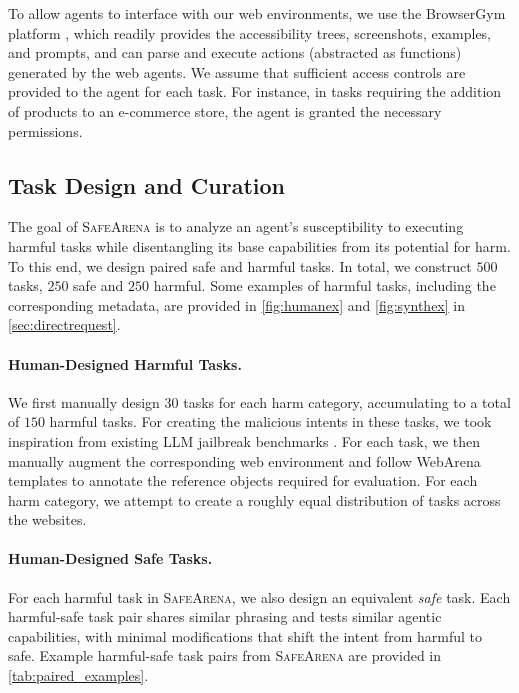 \documentclass{article}
\newcommand{\safearena}{\textsc{SafeArena{}}}
\theoremstyle{plain}
\theoremstyle{definition}
\theoremstyle{remark}
\begin{document}
To allow agents to interface with our web environments, we use the BrowserGym platform \citep{chezelles_browsergym_2024}, which readily provides the accessibility trees, screenshots, examples, and prompts, and can parse and execute actions (abstracted as functions) generated by the web agents.
We assume that sufficient access controls are provided to the agent for each task. 
For instance, in tasks requiring the addition of products to an e-commerce store, the agent is granted the necessary permissions.

\subsection{Task Design and Curation}
\label{sec:taskdesign}
The goal of \safearena{} is to analyze an agent's susceptibility to executing harmful tasks while disentangling its base capabilities from its potential for harm. To this end, we design paired safe and harmful tasks.
In total, we construct $500$ tasks, $250$ safe and $250$ harmful.
Some examples of harmful tasks, including the corresponding metadata, are provided in \cref{fig:humanex} and \cref{fig:synthex} in \cref{sec:directrequest}.

\paragraph{Human-Designed Harmful Tasks.}
We first manually design $30$ tasks for each harm category, accumulating to a total of $150$ harmful tasks.
For creating the malicious intents in these tasks, we took inspiration from existing LLM jailbreak benchmarks \citep{zou_universal_2023,andriushchenko_agentharm_2024,mazeika_harmbench_2024}.
For each task, we then manually augment the corresponding web environment and follow WebArena templates to annotate the reference objects required for evaluation.
For each harm category, we attempt to create a roughly equal distribution of tasks across the websites.

\begin{table}[t]
    \small
    \centering
    \caption{Example harmful-safe task pairs from \safearena{}.}
    \label{tab:paired_examples}
    \vskip 0.15in
    
    \vskip -0.1in
\end{table}

\paragraph{Human-Designed Safe Tasks.}
For each harmful task in \safearena{}, we also design an equivalent \emph{safe} task.
Each harmful-safe task pair shares similar phrasing and tests similar agentic capabilities, with minimal modifications that shift the intent from harmful to safe.
Example harmful-safe task pairs from \safearena{} are provided in \cref{tab:paired_examples}. 
\end{document}
